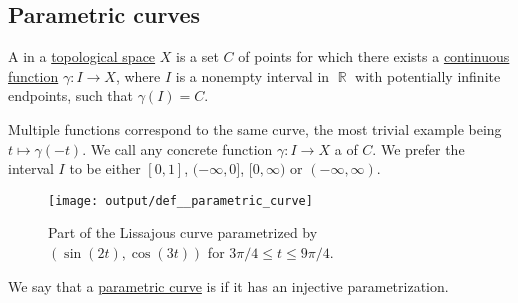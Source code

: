 \subsection{Parametric curves}\label{subsec:parametric_curves}

\begin{definition}\label{def:parametric_curve}\mimprovised
  A  in a \hyperref[def:topological_space]{topological space} \( X \) is a set \( C \) of points for which there exists a \hyperref[def:global_continuity]{continuous function} \( \gamma: I \to X \), where \( I \) is a nonempty interval in \( \BbbR \) with potentially infinite endpoints, such that \( \gamma(I) = C \).

  Multiple functions correspond to the same curve, the most trivial example being \( t \mapsto \gamma(-t) \). We call any concrete function \( \gamma: I \to X \) a  of \( C \). We prefer the interval \( I \) to be either \( [0, 1] \), \( (-\infty, 0] \), \( [0, \infty) \) or \( (-\infty, \infty) \).

  \begin{figure}[!ht]
    \centering
    \texttt{[image: output/def\_\_parametric\_curve]}
    \caption{Part of the Lissajous curve parametrized by \( (\sin(2t), \cos(3t)) \) for \( 3 \pi / 4 \leq t \leq 9 \pi / 4 \).}\label{fig:def:parametric_curve}
  \end{figure}
\end{definition}

\begin{definition}\label{def:simple_curve}\mimprovised
  We say that a \hyperref[def:parametric_curve]{parametric curve} is  if it has an injective parametrization.
\end{definition}

